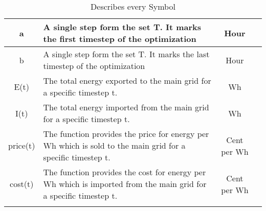 \begin{longtable}{|c|p{}|c|c|}
		a & A single step form the set T. It marks the first timestep of the optimization & Hour & \Cref{eq:opt} \\ \midrule
		b & A single step form the set T. It marks the last timestep of the optimization & Hour & \Cref{eq:opt} \\ \midrule
		E(t) & The total energy exported to the main grid for a specific timestep t. & Wh & \Cref{eq:opt} \\ \midrule
		I(t) & The total energy imported from the main grid for a specific timestep t. & Wh & \Cref{eq:opt} \\ \midrule
		price(t) & The function provides the price for energy per Wh which is sold to the main grid for a specific timestep t. & Cent per Wh & \Cref{eq:opt} \\ \midrule
		cost(t) & The function provides the cost for energy per Wh which is imported from the main grid for a specific timestep t. & Cent per Wh& \Cref{eq:opt} \\
		\bottomrule
			\caption[Nomenclature Table]{Describes every Symbol}
		\label{tab:Ergebnisse}
	\end{longtable}


